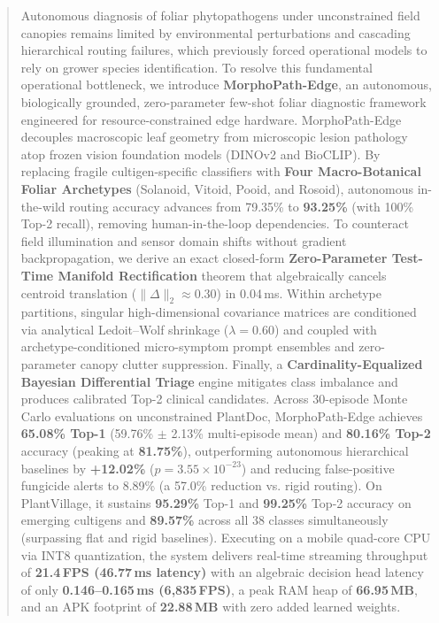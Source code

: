 \documentclass[conference]{IEEEtran}
\begin{document}
\begin{abstract}
Autonomous diagnosis of foliar phytopathogens under unconstrained field canopies remains limited by environmental perturbations and cascading hierarchical routing failures, which previously forced operational models to rely on grower species identification. To resolve this fundamental operational bottleneck, we introduce \textbf{MorphoPath-Edge}, an autonomous, biologically grounded, zero-parameter few-shot foliar diagnostic framework engineered for resource-constrained edge hardware. MorphoPath-Edge decouples macroscopic leaf geometry from microscopic lesion pathology atop frozen vision foundation models (DINOv2 and BioCLIP). By replacing fragile cultigen-specific classifiers with \textbf{Four Macro-Botanical Foliar Archetypes} (Solanoid, Vitoid, Pooid, and Rosoid), autonomous in-the-wild routing accuracy advances from 79.35\% to \textbf{93.25\%} (with 100\% Top-2 recall), removing human-in-the-loop dependencies. To counteract field illumination and sensor domain shifts without gradient backpropagation, we derive an exact closed-form \textbf{Zero-Parameter Test-Time Manifold Rectification} theorem that algebraically cancels centroid translation ($\|\Delta\|_2 \approx 0.30$) in 0.04\,ms. Within archetype partitions, singular high-dimensional covariance matrices are conditioned via analytical Ledoit--Wolf shrinkage ($\lambda=0.60$) and coupled with archetype-conditioned micro-symptom prompt ensembles and zero-parameter canopy clutter suppression. Finally, a \textbf{Cardinality-Equalized Bayesian Differential Triage} engine mitigates class imbalance and produces calibrated Top-2 clinical candidates. Across 30-episode Monte Carlo evaluations on unconstrained PlantDoc, MorphoPath-Edge achieves \textbf{65.08\% Top-1} (59.76\% $\pm$ 2.13\% multi-episode mean) and \textbf{80.16\% Top-2} accuracy (peaking at \textbf{81.75\%}), outperforming autonomous hierarchical baselines by \textbf{+12.02\%} ($p = 3.55 \times 10^{-23}$) and reducing false-positive fungicide alerts to 8.89\% (a 57.0\% reduction vs. rigid routing). On PlantVillage, it sustains \textbf{95.29\%} Top-1 and \textbf{99.25\%} Top-2 accuracy on emerging cultigens and \textbf{89.57\%} across all 38 classes simultaneously (surpassing flat and rigid baselines). Executing on a mobile quad-core CPU via INT8 quantization, the system delivers real-time streaming throughput of \textbf{21.4\,FPS (46.77\,ms latency)} with an algebraic decision head latency of only \textbf{0.146--0.165\,ms (6,835\,FPS)}, a peak RAM heap of \textbf{66.95\,MB}, and an APK footprint of \textbf{22.88\,MB} with zero added learned weights.
\end{abstract}
\end{document}
